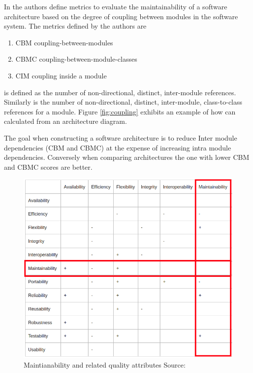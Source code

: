 \documentclass[15pt]{article}
\begin{document}
In \cite{lindvall_empirically-based_2003} the authors define metrics to evaluate the maintainability of a software architecture based on the degree of coupling between modules in the software system. The metrics defined by the authors are
\begin{enumerate}
\item CBM coupling-between-modules
\item CBMC coupling-between-module-classes
\item CIM coupling inside a module
\end{enumerate}

 is defined as the number of non-directional, distinct, inter-module references. Similarly  is the number of non-directional, distinct, inter-module, class-to-class references for a module. Figure \ref{fig:coupling} exhibits an example of how  can calculated from an architecture diagram.

The goal when constructing a software architecture is to reduce Inter module dependencies (CBM and CBMC) at the expense of increasing intra module dependencies. Conversely when comparing architectures the one with lower CBM and CBMC scores are better.

\begin{figure}
	\includegraphics[scale=0.35]{qualityAttributeRelation.png} 
	\caption{Maintianability and related quality attributes Source:\cite{morgan_implementing_2007}}
	\label{fig:qualityAttrs}
\end{figure}
\end{document}
